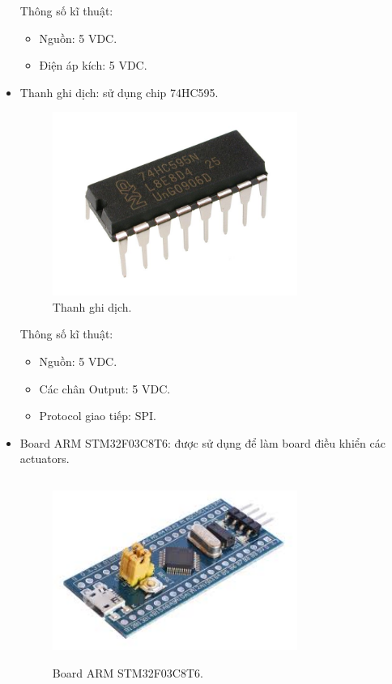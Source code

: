 \documentclass[a4paper,12pt,oneside]{article}
\begin{document}
\begin{itemize}
\noindent Thông số kĩ thuật\cite{dientuachau}:
\begin{itemize}
	\item Nguồn: 5 VDC.
	\item Điện áp kích: 5 VDC.
\end{itemize}

\item Thanh ghi dịch: sử dụng chip 74HC595.
\begin{figure}[H]
	\centering
	\includegraphics[height=6cm,width=8cm]{hinh/Register.jpg}
	\caption{Thanh ghi dịch\cite{dientuachau}.}
\end{figure}

\noindent Thông số kĩ thuật\cite{dientuachau}:
\begin{itemize}
	\item Nguồn: 5 VDC.
	\item Các chân Output: 5 VDC.
	\item Protocol giao tiếp: SPI.
\end{itemize}


\item Board ARM STM32F03C8T6: được sử dụng để làm board điều khiển các actuators.

\begin{figure}[H]
	\centering
	\includegraphics[height=6cm,width=8cm]{hinh/stm32.jpg}
	\caption{Board ARM STM32F03C8T6\cite{dientuachau}.}
\end{figure}


\end{itemize}
\end{document}
